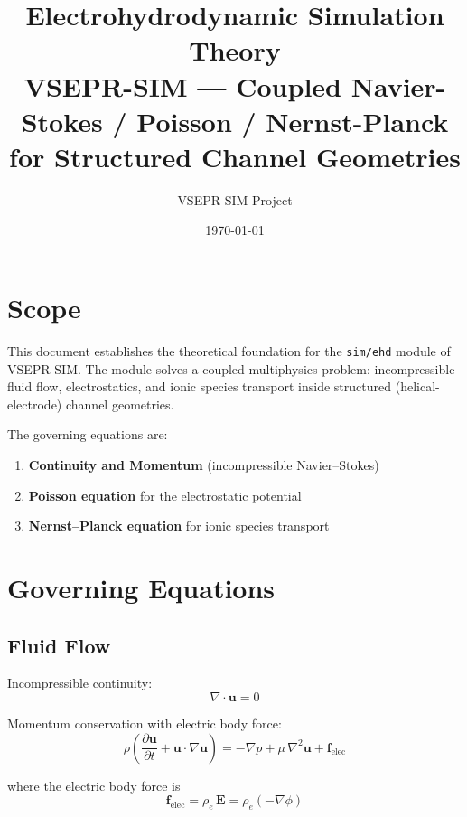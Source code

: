 \documentclass[11pt,a4paper]{article}
\title{Electrohydrodynamic Simulation Theory\\
       \large VSEPR-SIM --- Coupled Navier-Stokes / Poisson / Nernst-Planck\\
       for Structured Channel Geometries}
\author{VSEPR-SIM Project}
\date{\today}
\begin{document}
\maketitle

\section{Scope}

This document establishes the theoretical foundation for the
\texttt{sim/ehd} module of VSEPR-SIM.  The module solves a coupled
multiphysics problem: incompressible fluid flow, electrostatics, and ionic
species transport inside structured (helical-electrode) channel geometries.

The governing equations are:
\begin{enumerate}
  \item \textbf{Continuity and Momentum} (incompressible Navier--Stokes)
  \item \textbf{Poisson equation} for the electrostatic potential
  \item \textbf{Nernst--Planck equation} for ionic species transport
\end{enumerate}

\section{Governing Equations}

\subsection{Fluid Flow}

Incompressible continuity:
\begin{equation}
  \nabla\cdot\bm{u} = 0
\end{equation}

Momentum conservation with electric body force:
\begin{equation}
  \rho\!\left(\frac{\partial\bm{u}}{\partial t}
  + \bm{u}\cdot\nabla\bm{u}\right)
  = -\nabla p + \mu\,\nabla^{2}\bm{u} + \bm{f}_{\mathrm{elec}}
\end{equation}

where the electric body force is
\begin{equation}
  \bm{f}_{\mathrm{elec}} = \rho_{e}\,\bm{E}
  = \rho_{e}\!\left(-\nabla\phi\right)
\end{equation}
\end{document}

